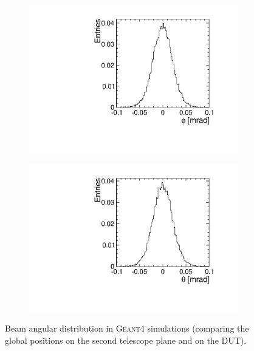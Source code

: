 \begin{figure}[htbp] \centering
  \begin{subfigure}[b]{0.45\textwidth}
    \includegraphics[width=\textwidth]{./figures/Telescope/MC_trackAnglePhi_planes_302_100.pdf}
    \caption{}
  \end{subfigure}\hfill
  \begin{subfigure}[b]{0.45\textwidth}
    \includegraphics[width=\textwidth]{./figures/Telescope/MC_trackAngleTheta_planes_302_100.pdf}
    \caption{}
  \end{subfigure}
  \caption{Beam angular distribution in \textsc{Geant4} simulations
(comparing the global positions on the second telescope plane and on
the DUT).}
  \label{fig:MCbeamAngleDistr}
\end{figure}

